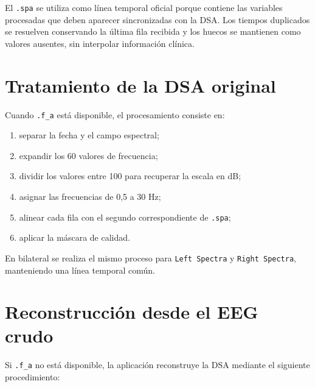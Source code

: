 \documentclass[
  spanish,
  a4paper,
  12pt,
  twoside]{memoir}
\providecommand{\tightlist}{%
  \setlength{\itemsep}{0pt}\setlength{\parskip}{0pt}}
\begin{document}
El \texttt{.spa} se utiliza como línea temporal oficial porque contiene
las variables procesadas que deben aparecer sincronizadas con la DSA.
Los tiempos duplicados se resuelven conservando la última fila recibida
y los huecos se mantienen como valores ausentes, sin interpolar
información clínica.

\chapter{Tratamiento de la DSA
original}\label{tratamiento-de-la-dsa-original}

Cuando \texttt{.f\_a} está disponible, el procesamiento consiste en:

\begin{enumerate}
\def\labelenumi{\arabic{enumi}.}
\tightlist
\item
  separar la fecha y el campo espectral;
\item
  expandir los 60 valores de frecuencia;
\item
  dividir los valores entre 100 para recuperar la escala en dB;
\item
  asignar las frecuencias de 0,5 a 30 Hz;
\item
  alinear cada fila con el segundo correspondiente de \texttt{.spa};
\item
  aplicar la máscara de calidad.
\end{enumerate}

En bilateral se realiza el mismo proceso para \texttt{Left\ Spectra} y
\texttt{Right\ Spectra}, manteniendo una línea temporal común.

\chapter{Reconstrucción desde el EEG
crudo}\label{reconstrucciuxf3n-desde-el-eeg-crudo}

Si \texttt{.f\_a} no está disponible, la aplicación reconstruye la DSA
mediante el siguiente procedimiento:
\end{document}
